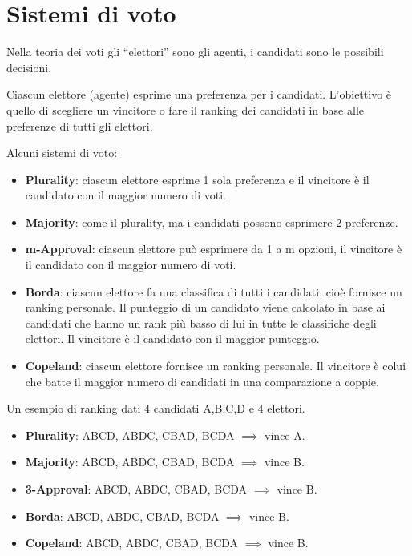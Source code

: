 \newpage

\section{Sistemi di voto}

Nella teoria dei voti gli ``elettori'' sono gli agenti, i candidati sono le
possibili decisioni.

Ciascun elettore (agente) esprime una preferenza per i candidati. L'obiettivo
è quello di scegliere un vincitore o fare il ranking dei candidati in base
alle preferenze di tutti gli elettori.

Alcuni sistemi di voto:

\begin{itemize}
 \item \textbf{Plurality}: ciascun elettore esprime 1 sola preferenza e il
vincitore è il candidato con il maggior numero di voti.
 \item \textbf{Majority}: come il plurality, ma i candidati possono esprimere
2 preferenze.
 \item \textbf{m-Approval}: ciascun elettore può esprimere da 1 a m opzioni,
il vincitore è il candidato con il maggior numero di voti.
 \item \textbf{Borda}: ciascun elettore fa una classifica di tutti i candidati,
cioè fornisce un ranking personale. Il punteggio di un candidato viene
calcolato in base ai candidati che hanno un rank più basso di lui in tutte
le classifiche degli elettori.
Il vincitore è il candidato con il maggior punteggio.
 \item \textbf{Copeland}: ciascun elettore fornisce un ranking personale.
Il vincitore è colui che batte il maggior numero di candidati in
una comparazione a coppie.
\end{itemize}

Un esempio di ranking dati 4 candidati A,B,C,D e 4 elettori.

\begin{itemize}
 \item \textbf{Plurality}: ABCD, ABDC, CBAD, BCDA $\implies$ vince A.
 \item \textbf{Majority}: ABCD, ABDC, CBAD, BCDA $\implies$ vince B.
 \item \textbf{3-Approval}: ABCD, ABDC, CBAD, BCDA $\implies$ vince B.
 \item \textbf{Borda}: ABCD, ABDC, CBAD, BCDA $\implies$ vince B.
 \item \textbf{Copeland}: ABCD, ABDC, CBAD, BCDA $\implies$ vince B.
\end{itemize}

